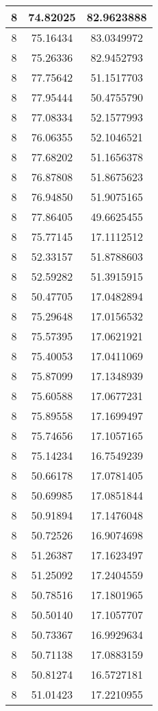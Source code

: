 \documentclass[
]{book}
\begin{document}
\begin{tabular}{c|c|c}
\hline
8 & 74.82025 & 82.9623888\\
\hline
8 & 75.16434 & 83.0349972\\
\hline
8 & 75.26336 & 82.9452793\\
\hline
8 & 77.75642 & 51.1517703\\
\hline
8 & 77.95444 & 50.4755790\\
\hline
8 & 77.08334 & 52.1577993\\
\hline
8 & 76.06355 & 52.1046521\\
\hline
8 & 77.68202 & 51.1656378\\
\hline
8 & 76.87808 & 51.8675623\\
\hline
8 & 76.94850 & 51.9075165\\
\hline
8 & 77.86405 & 49.6625455\\
\hline
8 & 75.77145 & 17.1112512\\
\hline
8 & 52.33157 & 51.8788603\\
\hline
8 & 52.59282 & 51.3915915\\
\hline
8 & 50.47705 & 17.0482894\\
\hline
8 & 75.29648 & 17.0156532\\
\hline
8 & 75.57395 & 17.0621921\\
\hline
8 & 75.40053 & 17.0411069\\
\hline
8 & 75.87099 & 17.1348939\\
\hline
8 & 75.60588 & 17.0677231\\
\hline
8 & 75.89558 & 17.1699497\\
\hline
8 & 75.74656 & 17.1057165\\
\hline
8 & 75.14234 & 16.7549239\\
\hline
8 & 50.66178 & 17.0781405\\
\hline
8 & 50.69985 & 17.0851844\\
\hline
8 & 50.91894 & 17.1476048\\
\hline
8 & 50.72526 & 16.9074698\\
\hline
8 & 51.26387 & 17.1623497\\
\hline
8 & 51.25092 & 17.2404559\\
\hline
8 & 50.78516 & 17.1801965\\
\hline
8 & 50.50140 & 17.1057707\\
\hline
8 & 50.73367 & 16.9929634\\
\hline
8 & 50.71138 & 17.0883159\\
\hline
8 & 50.81274 & 16.5727181\\
\hline
8 & 51.01423 & 17.2210955\\

\end{tabular}
\end{document}
